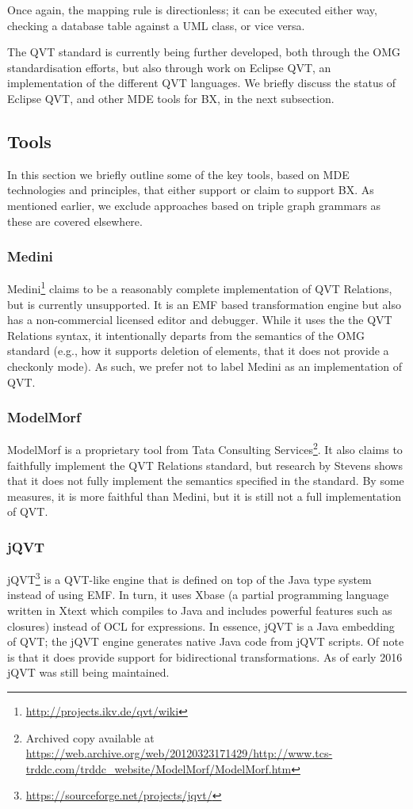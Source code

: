 Once again, the mapping rule is directionless; it can be executed either way, checking a database table against a UML class, or vice versa.

The QVT standard is currently being further developed, both through the OMG standardisation efforts, but also through work on Eclipse QVT, an implementation of the different QVT languages. We briefly discuss the status of Eclipse QVT, and other MDE tools for BX, in the next subsection.

\subsection{Tools}
In this section we briefly outline some of the key tools, based on MDE technologies and principles, that either support or claim to support BX. As mentioned earlier, we exclude approaches based on triple graph grammars as these are covered elsewhere.

\subsubsection{Medini}
Medini\footnote{\url{http://projects.ikv.de/qvt/wiki}} claims to be a reasonably complete implementation of QVT Relations, but is currently unsupported. It is an EMF based transformation engine but also has a non-commercial licensed editor and debugger. While it uses the the QVT Relations syntax, it intentionally departs from the semantics of the OMG standard (e.g., how it supports deletion of elements, that it does not provide a checkonly mode). As such, we prefer not to label Medini as an implementation of QVT.

\subsubsection{ModelMorf}
ModelMorf is a proprietary tool from Tata Consulting Services\footnote{Archived copy available at \url{https://web.archive.org/web/20120323171429/http://www.tcs-trddc.com/trddc_website/ModelMorf/ModelMorf.htm}}. It also claims to faithfully implement the QVT Relations standard, but research by Stevens \cite{Stevens13} shows that it does not fully implement the semantics specified in the standard. By some measures, it is more faithful than Medini, but it is still not a full implementation of QVT.

\subsubsection{jQVT}
jQVT\footnote{\url{https://sourceforge.net/projects/jqvt/}} is a QVT-like engine that is defined on top of the Java type system instead of using EMF. In turn, it uses Xbase (a partial programming language written in Xtext which compiles to Java and includes powerful features such as closures) instead of OCL for expressions. In essence, jQVT is a Java embedding of QVT; the jQVT engine generates native Java code from jQVT scripts. Of note is that it does provide support for bidirectional transformations. As of early 2016 jQVT was still being maintained.


